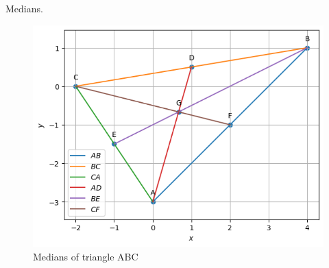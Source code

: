 \begin{table}[H]
        \centering
        
        \caption{Medians.}
        \label{tab:median}
    \end{table}
\begin{figure}[H]
	\includegraphics[width=\columnwidth]{median/figs/median.png}
\caption{Medians of triangle ABC}
\label{fig:i_median_py}
\end{figure}

